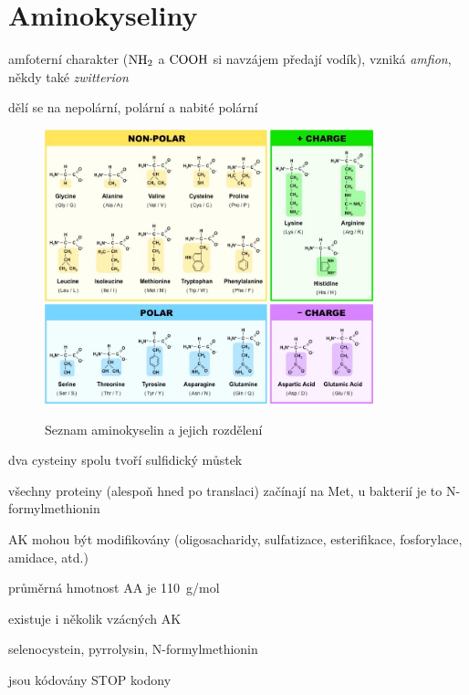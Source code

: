\documentclass[DIV=8]{scrreprt}
\begin{document}
\section{Aminokyseliny} \label{Aminokyseliny} \FloatBarrier



\begin{myItemize}[nosep]
    \item amfoterní charakter (\(\ce{NH2}\) a \(\ce{COOH}\) si navzájem předají vodík), vzniká \emph{amfion}, někdy také \emph{zwitterion}
    \item dělí se na nepolární, polární a nabité polární
\end{myItemize}



\begin{figure}
    \caption{Seznam aminokyselin a jejich rozdělení}
    \includegraphics[width=0.85\textwidth]{ak.jpeg}
    \centering
    \label{}
\end{figure}


\begin{myItemize}[nosep]
    \item dva cysteiny spolu tvoří sulfidický můstek
    \item všechny proteiny (alespoň hned po translaci) začínají na Met, u bakterií je to N-formylmethionin
    \item AK mo­hou být mod­i­fikovány (oligosacharidy, sul­fa­ti­zace, es­ter­i­fikace, fos­fory­lace, ami­dace, atd.)
    \item průměrná hmot­nost AA je \si{110 g/mol}
    \item existuje i několik vzácných AK
\begin{myItemize}[nosep]
    \item selenocystein, pyrrolysin, N-formylmethionin
    \item jsou kódovány STOP kodony
\end{myItemize}

\end{myItemize}
\end{document}

